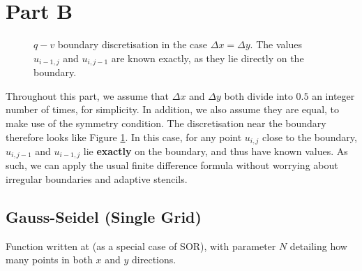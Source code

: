 \documentclass{article}
\numberwithin{equation}{section}
\theoremstyle{definition}
\begin{document}
\section{Part B}

\begin{figure}[H]
    \centering
    \caption{$q-v$ boundary discretisation in the case $\Delta x = \Delta y$. The values $u_{i-1,j}$ and $u_{i,j-1}$ are known exactly, as they lie directly on the boundary.}
    \label{fig:grid2}
\end{figure}
Throughout this part, we assume that $\Delta x$ and $\Delta y$ both divide into $0.5$ an integer number of times, for simplicity. In addition, we also assume they are equal, to make use of the symmetry condition. The discretisation near the boundary therefore looks like Figure \ref{fig:grid2}. In this case, for any point $u_{i,j}$ close to the boundary, $u_{i,j-1}$ and $u_{i-1,j}$ lie \textbf{exactly} on the boundary, and thus have known values. As such, we can apply the usual finite difference formula without worrying about irregular boundaries and adaptive stencils.

\subsection{Gauss-Seidel (Single Grid)}
Function written at  (as a special case of SOR), with parameter $N$ detailing how many points in both $x$ and $y$ directions.
\end{document}
